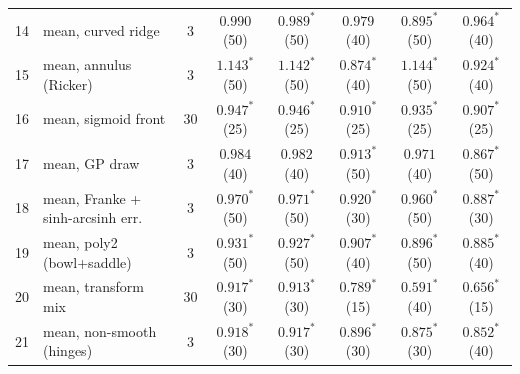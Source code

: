 \begin{tabular}{clcccccc}
14 & mean, curved ridge & 3 & $0.990$ {\tiny(50)} & $0.989^{*}$ {\tiny(50)} & $0.979$ {\tiny(40)} & $0.895^{*}$ {\tiny(50)} & $0.964^{*}$ {\tiny(40)} \\
15 & mean, annulus (Ricker) & 3 & $1.143^{*}$ {\tiny(50)} & $1.142^{*}$ {\tiny(50)} & $0.874^{*}$ {\tiny(40)} & $1.144^{*}$ {\tiny(50)} & $0.924^{*}$ {\tiny(40)} \\
16 & mean, sigmoid front & 30 & $0.947^{*}$ {\tiny(25)} & $0.946^{*}$ {\tiny(25)} & $0.910^{*}$ {\tiny(25)} & $0.935^{*}$ {\tiny(25)} & $0.907^{*}$ {\tiny(25)} \\
17 & mean, GP draw & 3 & $0.984$ {\tiny(40)} & $0.982$ {\tiny(40)} & $0.913^{*}$ {\tiny(50)} & $0.971$ {\tiny(40)} & $0.867^{*}$ {\tiny(50)} \\
18 & mean, Franke + sinh-arcsinh err. & 3 & $0.970^{*}$ {\tiny(50)} & $0.971^{*}$ {\tiny(50)} & $0.920^{*}$ {\tiny(30)} & $0.960^{*}$ {\tiny(50)} & $0.887^{*}$ {\tiny(30)} \\
19 & mean, poly2 (bowl+saddle) & 3 & $0.931^{*}$ {\tiny(50)} & $0.927^{*}$ {\tiny(50)} & $0.907^{*}$ {\tiny(40)} & $0.896^{*}$ {\tiny(50)} & $0.885^{*}$ {\tiny(40)} \\
20 & mean, transform mix & 30 & $0.917^{*}$ {\tiny(30)} & $0.913^{*}$ {\tiny(30)} & $0.789^{*}$ {\tiny(15)} & $\mathbf{0.591^{*}}$ {\tiny(40)} & $\mathbf{0.656^{*}}$ {\tiny(15)} \\
21 & mean, non-smooth (hinges) & 3 & $0.918^{*}$ {\tiny(30)} & $0.917^{*}$ {\tiny(30)} & $0.896^{*}$ {\tiny(30)} & $0.875^{*}$ {\tiny(30)} & $0.852^{*}$ {\tiny(40)} \\
\bottomrule
\end{tabular}
